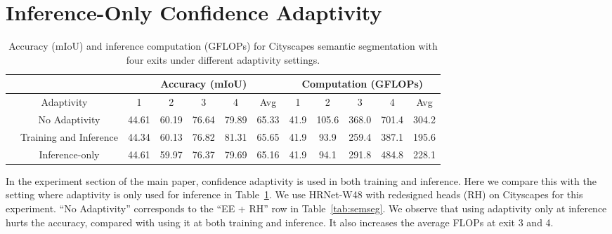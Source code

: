 \section{Inference-Only Confidence Adaptivity}
\begin{table}[h]
\vspace{0ex}
\centering
\footnotesize
\begin{tabular}{cc|ccccc|ccccc}
\hline
\multicolumn{2}{c|}{}                            & \multicolumn{5}{c}{Accuracy (mIoU)}         & \multicolumn{5}{|c}{Computation (GFLOPs)}            \\ \hline
\multicolumn{2}{c|}{Adaptivity}             & 1    & 2    & 3    & 4    & Avg  & 1     & 2     & 3     & 4      & Avg   \\ \hline
& No Adaptivity & 44.61  & 60.19 &  76.64  & 79.89 & 65.33   &   41.9 & 105.6 & 368.0 & 701.4 & 304.2  \\ 
& Training and Inference & 44.34 &	60.13 &	76.82 &	81.31  & 65.65 & 41.9 & 93.9 & 259.4 & 387.1 & 195.6  \\ 
& Inference-only & 44.61 &  59.97 &  76.37 &  79.69 & 65.16     & 41.9 &  94.1 &  291.8 & 484.8 & 228.1  \\ \hline
\end{tabular}
\vspace{0ex}
\caption{%
Accuracy (mIoU) and inference computation (GFLOPs) for Cityscapes semantic segmentation with four exits under different adaptivity settings.
}
\vspace{-1ex}
\label{tab:inference-only}
\end{table}

In the experiment section of the main paper, confidence adaptivity is used in both training and inference. Here we compare this with the setting where adaptivity is only used for inference in Table~\ref{tab:inference-only}. We use HRNet-W48 with redesigned heads (RH) on Cityscapes for this experiment. ``No Adaptivity'' corresponds to the ``EE + RH'' row in Table~\ref{tab:semseg}. We observe that using adaptivity only at inference hurts the accuracy, compared with using it at both training and inference. It also increases the average FLOPs at exit 3 and 4.



